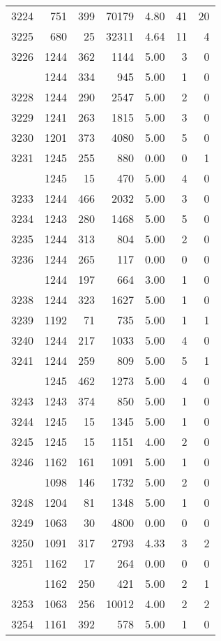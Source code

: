 \documentclass[
]{article}
\begin{document}
\begin{table}
\begin{tabular}[t]{lrrrrrr}
3224 & 751 & 399 & 70179 & 4.80 & 41 & 20\\
3225 & 680 & 25 & 32311 & 4.64 & 11 & 4\\
3226 & 1244 & 362 & 1144 & 5.00 & 3 & 0\\
\addlinespace
3227 & 1244 & 334 & 945 & 5.00 & 1 & 0\\
3228 & 1244 & 290 & 2547 & 5.00 & 2 & 0\\
3229 & 1241 & 263 & 1815 & 5.00 & 3 & 0\\
3230 & 1201 & 373 & 4080 & 5.00 & 5 & 0\\
3231 & 1245 & 255 & 880 & 0.00 & 0 & 1\\
\addlinespace
3232 & 1245 & 15 & 470 & 5.00 & 4 & 0\\
3233 & 1244 & 466 & 2032 & 5.00 & 3 & 0\\
3234 & 1243 & 280 & 1468 & 5.00 & 5 & 0\\
3235 & 1244 & 313 & 804 & 5.00 & 2 & 0\\
3236 & 1244 & 265 & 117 & 0.00 & 0 & 0\\
\addlinespace
3237 & 1244 & 197 & 664 & 3.00 & 1 & 0\\
3238 & 1244 & 323 & 1627 & 5.00 & 1 & 0\\
3239 & 1192 & 71 & 735 & 5.00 & 1 & 1\\
3240 & 1244 & 217 & 1033 & 5.00 & 4 & 0\\
3241 & 1244 & 259 & 809 & 5.00 & 5 & 1\\
\addlinespace
3242 & 1245 & 462 & 1273 & 5.00 & 4 & 0\\
3243 & 1243 & 374 & 850 & 5.00 & 1 & 0\\
3244 & 1245 & 15 & 1345 & 5.00 & 1 & 0\\
3245 & 1245 & 15 & 1151 & 4.00 & 2 & 0\\
3246 & 1162 & 161 & 1091 & 5.00 & 1 & 0\\
\addlinespace
3247 & 1098 & 146 & 1732 & 5.00 & 2 & 0\\
3248 & 1204 & 81 & 1348 & 5.00 & 1 & 0\\
3249 & 1063 & 30 & 4800 & 0.00 & 0 & 0\\
3250 & 1091 & 317 & 2793 & 4.33 & 3 & 2\\
3251 & 1162 & 17 & 264 & 0.00 & 0 & 0\\
\addlinespace
3252 & 1162 & 250 & 421 & 5.00 & 2 & 1\\
3253 & 1063 & 256 & 10012 & 4.00 & 2 & 2\\
3254 & 1161 & 392 & 578 & 5.00 & 1 & 0\\

\end{tabular}
\end{table}
\end{document}

